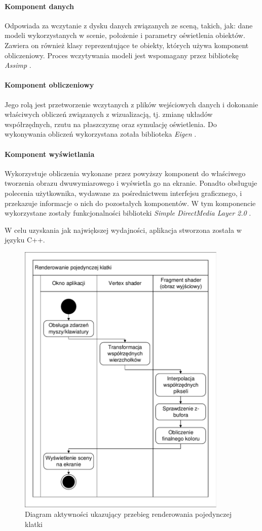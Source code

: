 \documentclass[10pt,a4paper]{article}
\begin{document}
\paragraph{Komponent danych}
Odpowiada za wczytanie z dysku danych związanych ze sceną, takich, jak: dane modeli wykorzystanych w scenie, położenie i parametry oświetlenia obiektów. Zawiera on również klasy reprezentujące te obiekty, których używa komponent obliczeniowy. Proces wczytywania modeli jest wspomagany przez bibliotekę \emph{Assimp} \cite{assimp}.

\paragraph{Komponent obliczeniowy}
Jego rolą jest przetworzenie wczytanych z plików wejściowych danych i dokonanie właściwych obliczeń związanych z wizualizacją, tj. zmianę układów współrzędnych, rzutu na płaszczyznę oraz symulację oświetlenia. Do wykonywania obliczeń wykorzystana zotała biblioteka \emph{Eigen} \cite{eigen}.

\paragraph{Komponent wyświetlania}
Wykorzystuje obliczenia wykonane przez powyższy komponent do właściwego tworzenia obrazu dwuwymiarowego i wyświetla go na ekranie. Ponadto obsługuje polecenia użytkownika, wydawane za pośrednictwem interfejsu graficznego, i przekazuje informacje o nich do pozostałych komponentów. W tym komponencie wykorzystane zostały funkcjonalności biblioteki \emph{Simple DirectMedia Layer 2.0} \cite{sdl}.

W celu uzyskania jak największej wydajności, aplikacja stworzona została w języku C++.

\begin{figure}[H]
	\centering
	\includegraphics[width=10cm]{frame-render-activity.pdf}
	\caption{Diagram aktywności ukazujący przebieg renderowania pojedynczej klatki}
\end{figure}
\end{document}
